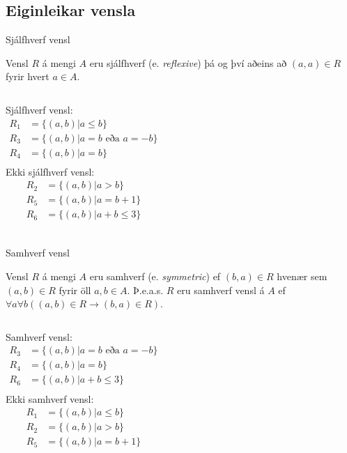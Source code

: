 \documentclass[handout]{beamer}
\begin{document}
\subsection{Eiginleikar vensla}

\begin{frame}{Sjálfhverf vensl}
\begin{tcolorbox}[title=Sjálfhverf vensl]
Vensl $R$ á mengi $A$ eru sjálfhverf (e. \emph{reflexive}) þá og því aðeins að $(a, a) \in R$ fyrir hvert $a \in A$.
\end{tcolorbox}
\vspace{0.5cm}
\begin{columns}
Sjálfhverf vensl:
\begin{align*}
R_1 &= \{(a, b)|a \leq b\}\\
R_3 &= \{(a, b)|a = b \text{ eða } a = -b\}\\
R_4 &= \{(a, b)|a = b\}\\
\end{align*}
Ekki sjálfhverf vensl:
\begin{align*}
R_2 &= \{(a, b)|a > b\}\\
R_5 &= \{(a, b)|a = b+1\}\\
R_6 &= \{(a, b)|a+b \leq 3\}\\
\end{align*}
\end{columns}
\end{frame}

\begin{frame}{Samhverf vensl}
\begin{tcolorbox}[title=Samhverf vensl]
Vensl $R$ á mengi $A$ eru samhverf (e. \emph{symmetric}) ef $(b, a) \in R$ hvenær sem $(a,b) \in R$ fyrir öll $a,b \in A$. Þ.e.a.s. $R$ eru samhverf vensl á $A$ ef $\forall a \forall b ((a,b) \in R \to (b, a) \in R)$.
\end{tcolorbox}
\vspace{0.5cm}
\begin{columns}
Samhverf vensl:
\begin{align*}
R_3 &= \{(a, b)|a = b \text{ eða } a = -b\}\\
R_4 &= \{(a, b)|a = b\}\\
R_6 &= \{(a, b)|a+b \leq 3\}\\
\end{align*}
Ekki samhverf vensl:
\begin{align*}
R_1 &= \{(a, b)|a \leq b\}\\
R_2 &= \{(a, b)|a > b\}\\
R_5 &= \{(a, b)|a = b+1\}\\
\end{align*}
\end{columns}
\end{frame}
\end{document}
